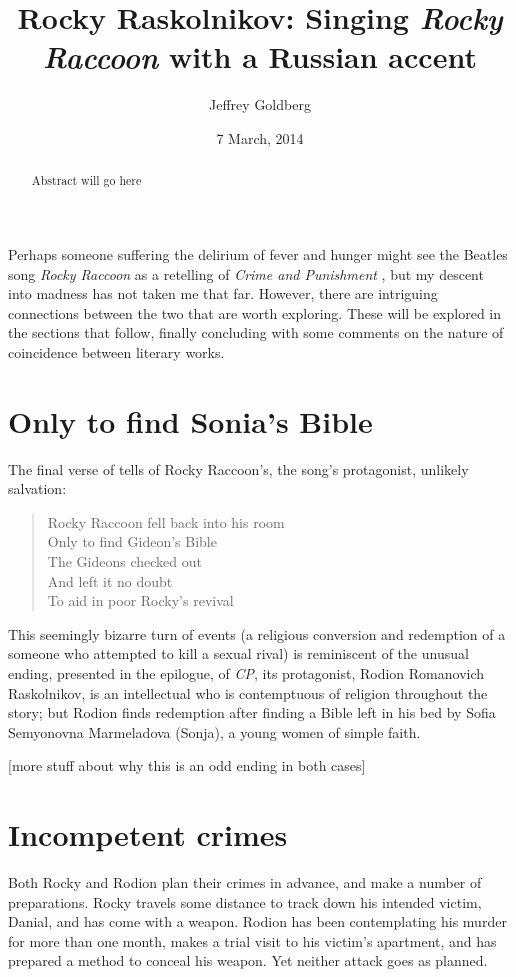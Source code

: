 \documentclass[russian,english,ib]{mlaresearch}
\title{Rocky Raskolnikov: Singing \textit{Rocky Raccoon} with a Russian accent}
\author{Jeffrey Goldberg}
\date{7 March, 2014}
\begin{document}
\makeIBtitle

\frontmatter
\clearpage
\begin{abstract}
Abstract will go here
\end{abstract}
\clearpage
\tableofcontents
\mainmatter


Perhaps someone suffering the delirium of fever and hunger might see the
Beatles song \textit{Rocky Raccoon} \autocite{Beatles:RR} as a retelling of
\textit{Crime and Punishment} \autocite{Dostoyevsky:CP}, but my descent into
madness has not taken me that far. However, there are intriguing connections
between the two that are worth exploring. These will be explored in the
sections that follow, finally concluding with some comments on the nature of
coincidence between literary works.

\section{Only to find Sonia's Bible}

The final verse of \autocite{Beatles:RR} tells of Rocky Raccoon's, the song's protagonist, unlikely salvation:

\begin{verse}
Rocky Raccoon fell back into his room\\
Only to find Gideon's Bible\\
The Gideons checked out\\
And left it no doubt\\
To aid in poor Rocky's revival
\end{verse}

This seemingly bizarre turn of events (a religious conversion and redemption
of a someone who attempted to kill a sexual rival) is reminiscent of the
unusual ending, presented in the epilogue, of \textit{CP}, its protagonist,
Rodion Romanovich Raskolnikov, is an intellectual who is contemptuous of
religion throughout the story; but Rodion finds redemption after finding a
Bible left in his bed by Sofia Semyonovna Marmeladova (Sonja), a young women
of simple faith.

[more stuff about why this is an odd ending in both cases]

\section{Incompetent crimes}

Both Rocky and Rodion plan their crimes in advance, and make a number of preparations. Rocky travels some distance to track down his intended victim, Danial, and has come with a weapon. Rodion has been contemplating his murder for more than one month, makes a trial visit to his victim's apartment, and has prepared a method to conceal his weapon. Yet neither attack goes as planned.
\end{document}
